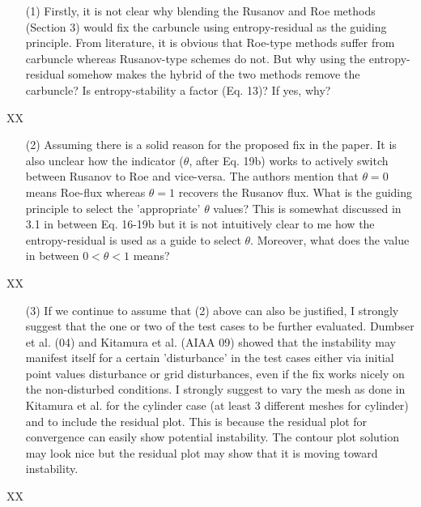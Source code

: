 \documentclass[english,11pt]{article}
\begin{document}
\bigskip
{\color{red}
  \begin{itemize}
    \item[(1)]
      Firstly, it is not clear why blending the Rusanov and Roe methods (Section 3) would fix the carbuncle
      using entropy-residual as the guiding principle. From literature, it is obvious that Roe-type methods suffer
      from carbuncle whereas Rusanov-type schemes do not. But why using the entropy-residual somehow
      makes the hybrid of the two methods remove the carbuncle? Is entropy-stability a factor (Eq. 13)? If yes,
      why?
  \end{itemize}
}
\noindent
XX

\bigskip
{\color{red}
  \begin{itemize}
  \item[(2)]
    Assuming there is a solid reason for the proposed fix in the paper. It is also unclear how the indicator
    ($\theta$, after Eq. 19b) works to actively switch between Rusanov to Roe and vice-versa. The authors
    mention that $\theta=0$ means Roe-flux whereas $\theta=1$ recovers the Rusanov flux. What is the guiding
    principle to select the 'appropriate' $\theta$ values? This is somewhat discussed in 3.1 in between Eq. 
    16-19b but it is not intuitively clear to me how the entropy-residual is used as a guide to select $\theta$.
    Moreover, what does the value in between $0<\theta<1$ means?
  \end{itemize}
}
\noindent
XX

\bigskip
{\color{red}
  \begin{itemize}
  \item[(3)]
    If we continue to assume that (2) above can also be justified, I strongly suggest that the one or two of
    the test cases to be further evaluated. Dumbser et al. (04) and Kitamura et al. (AIAA 09) showed that the
    instability may manifest itself for a certain 'disturbance' in the test cases either via initial point values
    disturbance or grid disturbances, even if the fix works nicely on the non-disturbed conditions. I strongly
    suggest to vary the mesh as done in Kitamura et al. for the cylinder case (at least 3 different meshes for
    cylinder) and to include the residual plot. This is because the residual plot for convergence can easily show
    potential instability. The contour plot solution may look nice but the residual plot may show that it is
    moving toward instability.
  \end{itemize}
}
\noindent
XX
\end{document}

